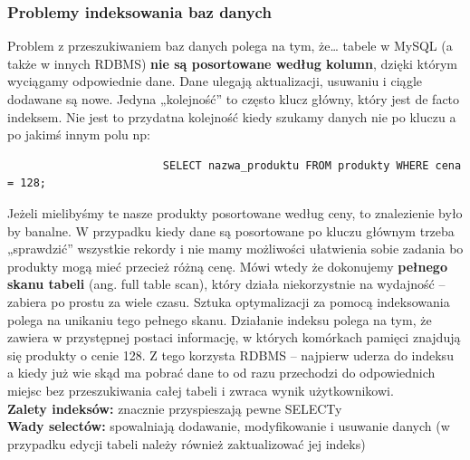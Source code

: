 \documentclass[a4paper,12pt,oneside]{book}
\begin{document}
				\subsubsection{Problemy indeksowania baz danych}
				Problem z przeszukiwaniem baz danych polega na tym, że… tabele w MySQL (a także w innych RDBMS) \textbf{nie są posortowane według kolumn}, dzięki którym wyciągamy odpowiednie dane. Dane ulegają aktualizacji, usuwaniu i ciągle dodawane są nowe. Jedyna „kolejność” to często klucz główny, który jest de facto indeksem. Nie jest to przydatna kolejność kiedy szukamy danych nie po kluczu a po jakimś innym polu np:
					\begin{verbatim}
						SELECT nazwa_produktu FROM produkty WHERE cena = 128; 
					\end{verbatim}
				Jeżeli mielibyśmy te nasze produkty posortowane według ceny, to znalezienie było by banalne. W przypadku kiedy dane są posortowane po kluczu głównym trzeba „sprawdzić” wszystkie rekordy i nie mamy możliwości ułatwienia sobie zadania bo produkty mogą mieć przecież różną cenę. Mówi wtedy że dokonujemy \textbf{pełnego skanu tabeli} (ang. full table scan), który działa niekorzystnie na wydajność – zabiera po prostu za wiele czasu. Sztuka optymalizacji za pomocą indeksowania polega na unikaniu tego pełnego skanu. Działanie indeksu polega na tym, że zawiera w przystępnej postaci informację, w których komórkach pamięci znajdują się produkty o cenie 128. Z tego korzysta RDBMS – najpierw uderza do indeksu a kiedy już wie skąd ma pobrać dane to od razu przechodzi do odpowiednich miejsc bez przeszukiwania całej tabeli i zwraca wynik użytkownikowi. \\
				
				\noindent \textbf{Zalety indeksów:} znacznie przyspieszają pewne SELECTy \\
				\textbf{Wady selectów:} spowalniają dodawanie, modyfikowanie i usuwanie danych (w przypadku edycji tabeli należy również zaktualizować jej indeks)
				
\end{document}
